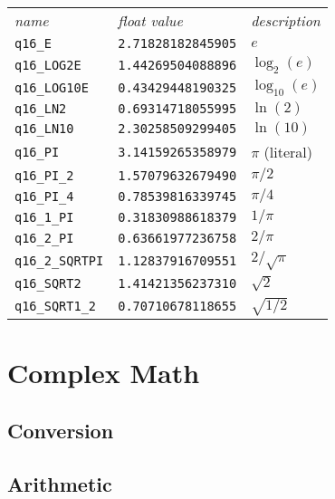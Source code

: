 {\small
    \begin{tabular*}{0.65\textwidth}{l@{\extracolsep{\fill}}ll}
    \toprule
    {\it name} &
    {\it float value} &
    {\it description}\\\otoprule
    {\tt q16\_E}            & {\tt 2.71828182845905}    & $e$\\
    {\tt q16\_LOG2E}        & {\tt 1.44269504088896}    & $\log_2(e)$\\
    {\tt q16\_LOG10E}       & {\tt 0.43429448190325}    & $\log_{10}(e)$\\
    {\tt q16\_LN2}          & {\tt 0.69314718055995}    & $\ln(2)$\\
    {\tt q16\_LN10}         & {\tt 2.30258509299405}    & $\ln(10)$\\
    {\tt q16\_PI}           & {\tt 3.14159265358979}    & $\pi$ (literal)\\
    {\tt q16\_PI\_2}        & {\tt 1.57079632679490}    & $\pi/2$\\
    {\tt q16\_PI\_4}        & {\tt 0.78539816339745}    & $\pi/4$\\
    {\tt q16\_1\_PI}        & {\tt 0.31830988618379}    & $1/\pi$\\
    {\tt q16\_2\_PI}        & {\tt 0.63661977236758}    & $2/\pi$\\
    {\tt q16\_2\_SQRTPI}    & {\tt 1.12837916709551}    & $2/\sqrt{\pi}$\\
    {\tt q16\_SQRT2}        & {\tt 1.41421356237310}    & $\sqrt{2}$\\
    {\tt q16\_SQRT1\_2}     & {\tt 0.70710678118655}    & $\sqrt{1/2}$\\\bottomrule
    \end{tabular*}
} %


% 
%
\section{Complex Math}
\label{section:fpm:math-complex}

\subsection{Conversion}
\label{section:fpm:math-complex:conversion}

\subsection{Arithmetic}
\label{section:fpm:math-complex:arithmetic}

